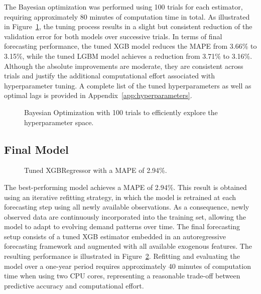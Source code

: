 The Bayesian optimization was performed using 100 trials for each estimator, requiring approximately 80 minutes of computation time in total. As illustrated in Figure~\ref{fig:tuning}, the tuning process results in a slight but consistent reduction of the validation error for both models over successive trials. In terms of final forecasting performance, the tuned \ac{XGB} model reduces the MAPE from 3.66\% to 3.15\%, while the tuned \ac{LGBM} model achieves a reduction from 3.71\% to 3.16\%. Although the absolute improvements are moderate, they are consistent across trials and justify the additional computational effort associated with hyperparameter tuning. A complete list of the tuned hyperparameters as well as optimal lags is provided in Appendix~\ref{app:hyperparameters}.
\begin{figure}[H]
    \centering
    
    \caption{Bayesian Optimization with 100 trials to efficiently explore the hyperparameter space.}
    \label{fig:tuning}
\end{figure}

\subsection{Final Model}
\label{subsec:final}
\begin{figure}[b!]
    \centering
    
    \caption{Tuned XGBRegressor with a \acs{MAPE} of 2.94\%.}
    \label{fig:final_model}
\end{figure}
The best-performing model achieves a \ac{MAPE} of 2.94\%. This result is obtained using an iterative refitting strategy, in which the model is retrained at each forecasting step using all newly available observations. As a consequence, newly observed data are continuously incorporated into the training set, allowing the model to adapt to evolving demand patterns over time. The final forecasting setup consists of a tuned \ac{XGB} estimator embedded in an autoregressive forecasting framework and augmented with all available exogenous features. The resulting performance is illustrated in Figure~\ref{fig:final_model}. Refitting and evaluating the model over a one-year period requires approximately 40 minutes of computation time when using two CPU cores, representing a reasonable trade-off between predictive accuracy and computational effort.
